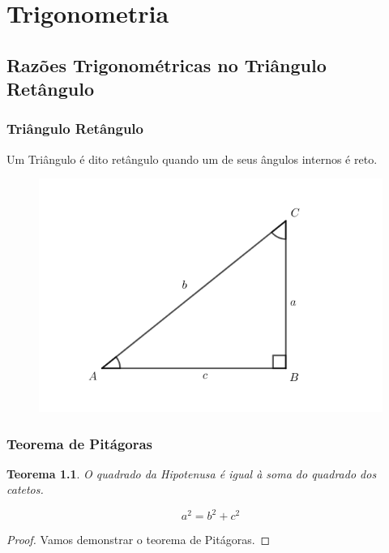 \chapter{Trigonometria}

\section{Razões Trigonométricas no Triângulo Retângulo}

\subsection{Triângulo Retângulo}


Um Triângulo é dito retângulo quando um de seus ângulos internos é reto. 


\begin{figure}[H]
	\centering
	
	\includegraphics[scale=3.5]{imagens/triangulo-retangulo.png}

\end{figure}

\subsection{Teorema de Pitágoras}
\newtheorem{teorema}{Teorema}
\begin{teorema}
	O quadrado da Hipotenusa é igual à soma do quadrado dos catetos.
\end{teorema}

		$$a^{2}=b^{2}+c^{2}$$ 
		
\newtheorem{proof}{Demonstração}
\begin{proof}
Vamos demonstrar o teorema de Pitágoras.
\end{proof}

